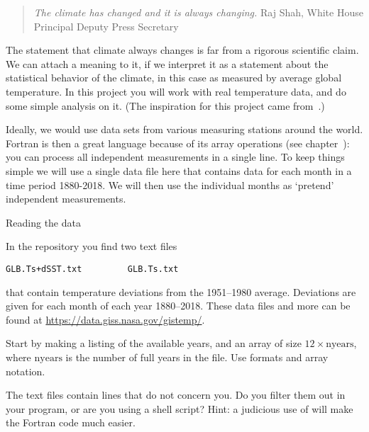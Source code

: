 
\begin{quotation}
  \noindent
  \textsl{The climate has changed and it is always changing.}
  \hfill\break\hbox{}\hfill Raj Shah, White House Principal Deputy Press Secretary\par
\end{quotation}

The statement that climate always changes is far from a rigorous
scientific claim.  We can attach a meaning to it, if we interpret it
as a statement about the statistical behavior of the climate, in this
case as measured by average global temperature.  In this project you
will work with real temperature data, and do some simple analysis on
it. (The inspiration for this project came
from~\cite{ManRestrepo:climatechange}.)

Ideally, we would use data sets from various measuring stations around
the world. Fortran is then a great language because of its array
operations (see chapter~): you can process all
independent measurements in a single line. To keep things simple we
will use a single data file here that contains data for each month in
a time period 1880-2018. We will then use the individual months as
`pretend' independent measurements.

 {Reading the data}

In the repository you find two text files
\begin{verbatim}
GLB.Ts+dSST.txt         GLB.Ts.txt
\end{verbatim}
that contain temperature deviations from the 1951--1980 average.
Deviations are given for each month of each year 1880--2018. These
data files and more can be found at
\url{https://data.giss.nasa.gov/gistemp/}.

\begin{exercise}
  Start by making a listing of the available years, and an array
   of size $12\times\mathrm{nyears}$, where
  $\mathrm{nyears}$ is the number of full years in the file.
  Use formats and array notation.

  The text files contain lines that do not concern you. Do you filter
  them out in your program, or are you using a shell script? Hint: a
  judicious use of  will make the Fortran code much easier.
\end{exercise}

